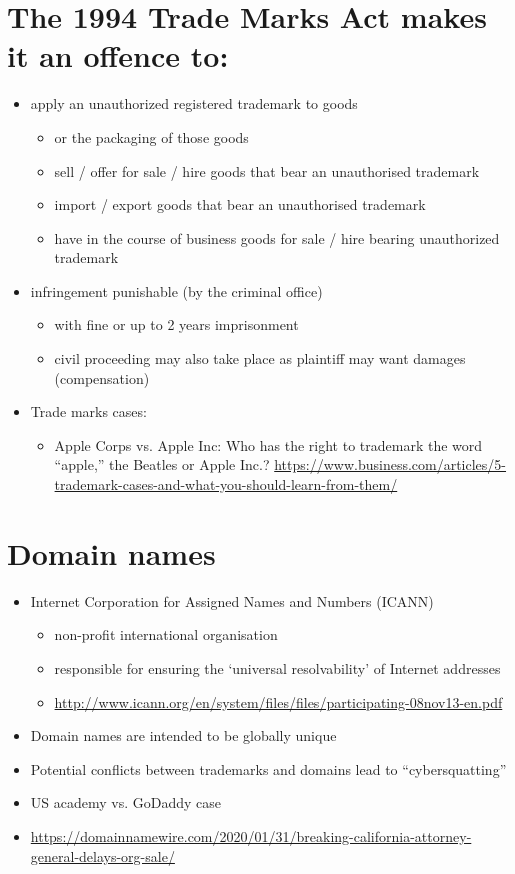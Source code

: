 \documentclass{article}
\begin{document}
\section{The 1994 Trade Marks Act makes it an offence to:}
\begin{itemize}
\item apply an unauthorized registered trademark to goods 
\begin{itemize}
\item or the packaging of those goods
\item sell / offer for sale / hire goods that bear an unauthorised trademark
\item import / export goods that bear an unauthorised trademark
\item have in the course of business goods for sale / hire bearing unauthorized trademark
\end{itemize}
\item infringement punishable (by the criminal office) 
\begin{itemize}
\item with fine or up to 2 years imprisonment
\item civil proceeding may also take place as plaintiff may want damages (compensation)
\end{itemize}
\item Trade marks cases:
\begin{itemize}
\item Apple Corps vs. Apple Inc: Who has the right to trademark the word ``apple,'' the Beatles or Apple Inc.?
\url{https://www.business.com/articles/5-trademark-cases-and-what-you-should-learn-from-them/}
\end{itemize}
\end{itemize}



\section{Domain names}
\begin{itemize}
\item Internet Corporation for Assigned Names and Numbers (ICANN)
\begin{itemize}
\item non-profit international organisation
\item responsible for ensuring the `universal resolvability' of Internet addresses 
\item \url{http://www.icann.org/en/system/files/files/participating-08nov13-en.pdf}
\end{itemize}
\item Domain names are intended to be globally unique
\item Potential conflicts between trademarks and domains lead to ``cybersquatting''
\item US academy vs. GoDaddy case
\item \url{https://domainnamewire.com/2020/01/31/breaking-california-attorney-general-delays-org-sale/}
\end{itemize}
\end{document}
